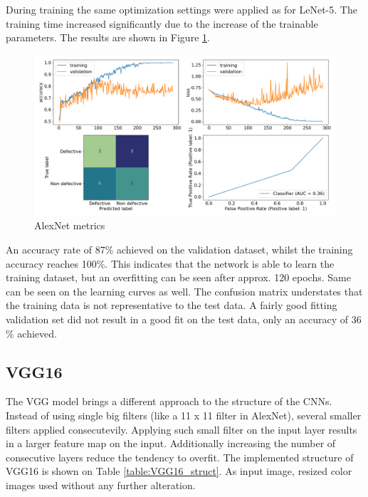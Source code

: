 \documentclass[10pt, final]{article}
\begin{document}
During training the same optimization settings were applied as for LeNet-5.
The training time increased significantly due to the increase of the trainable parameters.
The results are shown in Figure \ref{fig:AlexNet_metrics}.

\begin{figure}[!ht]
	\centering
	\includegraphics[width=\textwidth]{./tex_graphs/metrics_AlexNet.png}
	\caption{AlexNet metrics}
	\label{fig:AlexNet_metrics}
\end{figure}

An accuracy rate of 87\% achieved on the validation dataset, whilst the training accuracy reaches 100\%.
This indicates that the network is able to learn the training dataset, but an overfitting can be seen after
approx. 120 epochs.
Same can be seen on the learning curves as well.
The confusion matrix understates that the training data is not representative to the test data.
A fairly good fitting validation set did not result in a good fit on the test data, only an accuracy of
36 \% achieved.

\subsection{VGG16} \label{sec:VGG16}
The VGG model brings a different approach to the structure of the CNNs.
Instead of using single big filters (like a 11 x 11 filter in AlexNet), several smaller filters applied
consecutevily.
Applying such small filter on the input layer results in a larger feature map on the input.
Additionally increasing the number of consecutive layers reduce the tendency to overfit.
The implemented structure of VGG16 is shown on Table \ref{table:VGG16_struct}.
As input image, resized color images used without any further alteration.
\end{document}
